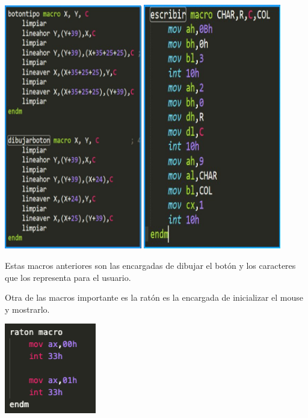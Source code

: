\documentclass[letterpaper,12 pt,titlepage]{article}
\begin{document}
    \begin{center}
        \includegraphics[width=0.45\textwidth]{img/15.png}
        \includegraphics[width=0.45\textwidth]{img/16.png}
    \end{center}

    Estas macros anteriores son las encargadas de dibujar el botón y los caracteres que los representa para el usuario.

    Otra de las macros importante es la ratón es la encargada de inicializar el mouse y mostrarlo.

    \begin{center}
        \includegraphics[width=0.3\textwidth]{img/17.png}
    \end{center}
\end{document}
